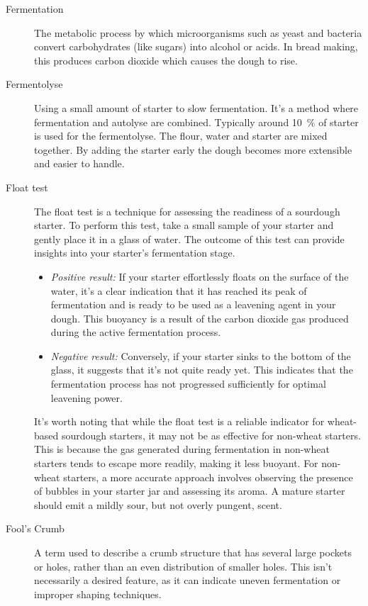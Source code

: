 \begin{description}
\item[Fermentation] The metabolic process by which microorganisms such as yeast
and bacteria convert carbohydrates (like sugars) into alcohol or acids. In bread
making, this produces carbon dioxide which causes the dough to rise.

\item[Fermentolyse] Using a small amount of starter to slow fermentation.
It's a method where fermentation and autolyse are combined. Typically around \SI{10}{\percent}
of starter is used for the fermentolyse. The flour, water and starter are mixed
together. By adding the starter early the dough becomes more extensible and easier
to handle.

\item[Float test] The float test is a technique for assessing the readiness
of a sourdough starter. To perform this test, take a small sample of
your starter and gently place it in a glass of water. The outcome
of this test can provide insights into your starter's fermentation stage.

\begin{itemize}
\item[] \emph{Positive result:} If your starter effortlessly floats on the
surface of the water, it's a clear indication that it has reached its peak
of fermentation and is ready to be used as a leavening agent in your dough.
This buoyancy is a result of the carbon dioxide gas produced during
the active fermentation process.
\item[] \emph{Negative result:} Conversely, if your starter sinks to the
bottom of the glass, it suggests that it's not quite ready yet.
This indicates that the fermentation process has not progressed
sufficiently for optimal leavening power.
\end{itemize}

It's worth noting that while the float test is a reliable indicator
for wheat-based sourdough starters, it may not be as effective for non-wheat
starters. This is because the gas generated during fermentation in non-wheat
starters tends to escape more readily, making it less buoyant. For non-wheat
starters, a more accurate approach involves observing the presence of
bubbles in your starter jar and assessing its aroma. A mature starter should
emit a mildly sour, but not overly pungent, scent.

\item[Fool’s Crumb] A term used to describe a crumb structure that has several
large pockets or holes, rather than an even distribution of smaller holes. This
isn't necessarily a desired feature, as it can indicate uneven fermentation or
improper shaping techniques.


\end{description}
